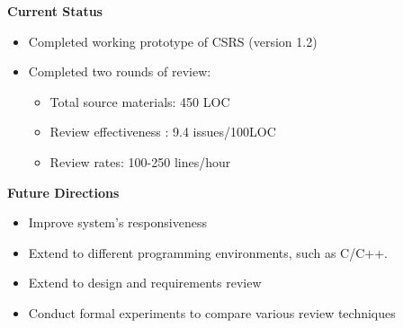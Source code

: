 \begin{slide} \Huge
{\bf Current Status}
  \horizontalline
\begin{itemize}
\item Completed working prototype of CSRS (version 1.2)
\item Completed two rounds of review:
 \begin{itemize}
   \item Total source materials: 450 LOC
   \item Review effectiveness : 9.4 issues/100LOC
   \item Review rates: 100-250 lines/hour
 \end {itemize}
\end{itemize}
\end{slide} \Huge


\begin{slide} \Huge
{\bf Future Directions}
  \horizontalline
\begin{itemize}
\item Improve system's responsiveness
\item Extend to different programming environments, such as C/C++.
\item Extend to design and requirements review
\item Conduct formal experiments to compare various review techniques
\end{itemize}
\end{slide} \Huge





